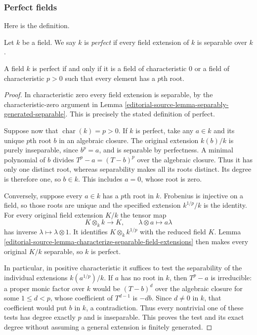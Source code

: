 \subsubsection{Perfect fields}
\label{editorial-source-section-perfect-fields}

\noindent
Here is the definition.

\begin{definition}
\label{editorial-source-definition-perfect}
Let $k$ be a field. We say $k$ is {\it perfect}
if every field extension of $k$ is separable over $k$.
\end{definition}

\begin{lemma}
\label{editorial-source-lemma-perfect}
A field $k$ is perfect if and only if it is a field of characteristic $0$
or a field of characteristic $p > 0$ such that every element has a $p$th
root.
\end{lemma}

\begin{proof}
In characteristic zero every field extension is
separable, by the characteristic-zero argument in
Lemma \ref{editorial-source-lemma-separably-generated-separable}.
This is precisely the stated definition of perfect.

Suppose now that $\operatorname{char}(k)=p>0$.
If $k$ is perfect, take any $a\in k$ and its unique
$p$th root $b$ in an algebraic closure. The original
extension $k(b)/k$ is purely inseparable, since
$b^p=a$, and is separable by perfectness. A minimal
polynomial of $b$ divides $T^p-a=(T-b)^p$ over the
algebraic closure. Thus it has only one distinct
root, whereas separability makes all its roots
distinct. Its degree is therefore one, so $b\in k$.
This includes $a=0$, whose root is zero.

Conversely, suppose every $a\in k$ has a $p$th root
in $k$. Frobenius is injective on a field, so those
roots are unique and the specified extension
$k^{1/p}/k$ is the identity. For every original
field extension $K/k$ the tensor map
$$
K\otimes_k k\longrightarrow K,\qquad
\lambda\otimes a\longmapsto a\lambda
$$
has inverse $\lambda\mapsto\lambda\otimes1$.
It identifies $K\otimes_k k^{1/p}$ with the reduced
field $K$. Lemma
\ref{editorial-source-lemma-characterize-separable-field-extensions}
then makes every original $K/k$ separable, so $k$
is perfect.

In particular, in positive characteristic it
suffices to test the separability of the individual
extensions $k(a^{1/p})/k$. If $a$ has no root in $k$,
then $T^p-a$ is irreducible: a proper monic factor
over $k$ would be $(T-b)^d$ over the algebraic
closure for some $1\leq d<p$, whose coefficient
of $T^{d-1}$ is $-db$. Since $d\neq0$ in $k$,
that coefficient would put $b$ in $k$, a contradiction.
Thus every nontrivial one of these tests has degree
exactly $p$ and is inseparable. This proves the
test and its exact degree without assuming a
general extension is finitely generated.
\end{proof}

